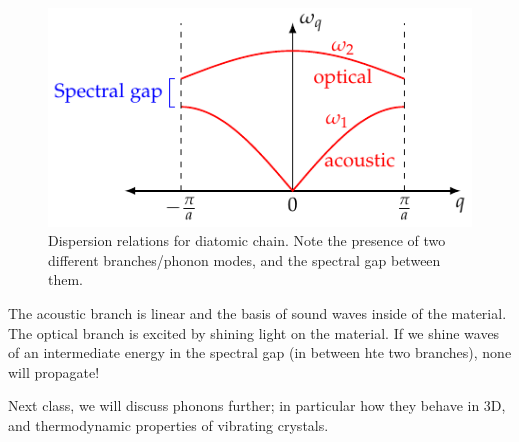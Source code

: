 \begin{figure}[htbp]
    \centering
    \includegraphics[]{Images/dig-diachaindispersion.pdf}

    \caption{Dispersion relations for diatomic chain. Note the presence of two different branches/phonon modes, and the spectral gap between them.}
    \label{fig-diachaindispersion}
\end{figure}

The acoustic branch is linear and the basis of sound waves inside of the material. The optical branch is excited by shining light on the material. If we shine waves of an intermediate energy in the spectral gap (in between hte two branches), none will propagate!

Next class, we will discuss phonons further; in particular how they behave in 3D, and thermodynamic properties of vibrating crystals.